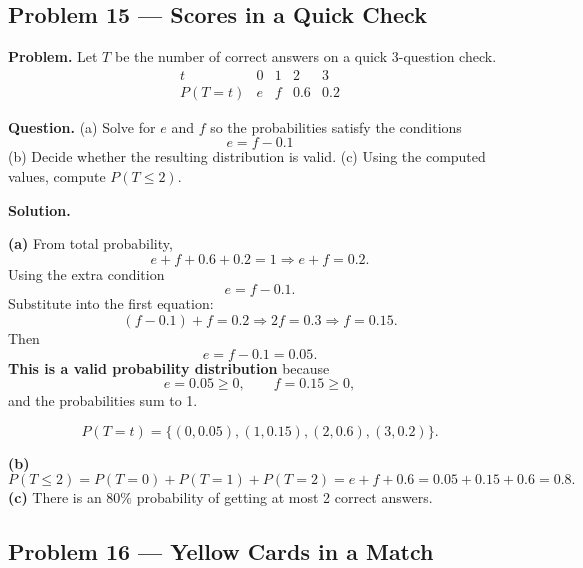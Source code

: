 \begin{ExamProblems}
		
		
		
		\item
		\subsection*{Problem 15 — Scores in a Quick Check}
			\textbf{Problem.}
		Let $T$ be the number of correct answers on a quick 3-question check.
		\[
		\begin{array}{c|cccc}
			t & 0 & 1 & 2 & 3\\
			\hline
			P(T=t) & e & f & 0.6 & 0.2
		\end{array}
		\]
		
		\textbf{Question.}
		(a) Solve for $e$ and $f$ so the probabilities satisfy the conditions
		\[ e=f-0.1		\]
		(b) Decide whether the resulting distribution is valid.
		(c) Using the computed values, compute $P(T\le 2)$.
		
		\textbf{Solution.}

		\textbf{(a)} From total probability,
		\[
		e+f+0.6+0.2=1\Rightarrow e+f=0.2.
		\]
		Using the extra condition
		\[
		e=f-0.1.
		\]
		Substitute into the first equation:
		\[
		(f-0.1)+f=0.2\Rightarrow 2f=0.3\Rightarrow f=0.15.
		\]
		Then
		\[
		e=f-0.1=0.05.
		\]
		\textbf{This is a valid probability distribution} because
		\[
		e=0.05\ge 0,\qquad f=0.15\ge 0,
		\]
		and the probabilities sum to 1.

		
\[
		P(T=t)=\{(0,0.05),(1,0.15),(2,0.6),(3,0.2)\}.
		\]
\begin{center}
		\end{center}
\textbf{(b)}
		\[
		P(T\le 2)=P(T=0)+P(T=1)+P(T=2)=e+f+0.6=0.05+0.15+0.6=0.8.
		\]
		\textbf{(c)} There is an $80\%$ probability of getting at most 2 correct answers.
		
		
		\item
		\subsection*{Problem 16 — Yellow Cards in a Match}
		

\end{ExamProblems}

